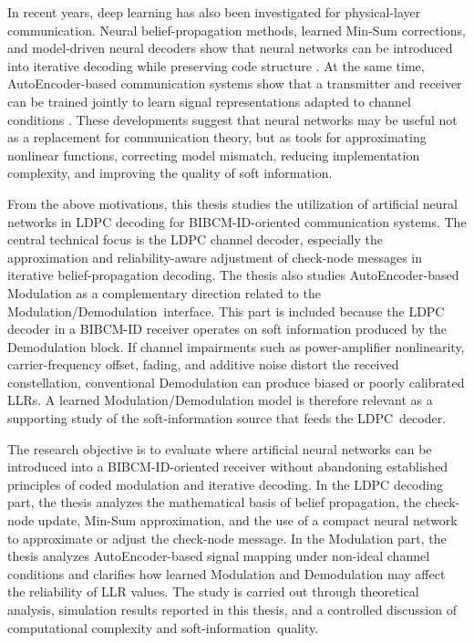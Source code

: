 In recent years, deep learning has also been investigated for physical-layer communication. Neural belief-propagation methods, learned Min-Sum corrections, and model-driven neural decoders show that neural networks can be introduced into iterative decoding while preserving code structure \cite{nachmani2016,nachmani2018,kuck2020,wang2022}. At the same time, AutoEncoder-based communication systems show that a transmitter and receiver can be trained jointly to learn signal representations adapted to channel conditions \cite{oshea2017,dorner2018,aoudia2019}. These developments suggest that neural networks may be useful not as a replacement for communication theory, but as tools for approximating nonlinear functions, correcting model mismatch, reducing implementation complexity, and improving the quality of soft information.

From the above motivations, this thesis studies the utilization of artificial neural networks in LDPC decoding for BIBCM-ID-oriented communication systems. The central technical focus is the LDPC channel decoder, especially the approximation and reliability-aware adjustment of check-node messages in iterative belief-propagation decoding. The thesis also studies AutoEncoder-based Modulation as a complementary direction related to the Modulation/Demodulation~interface. This part is included because the LDPC decoder in a BIBCM-ID receiver operates on soft information produced by the Demodulation block. If channel impairments such as power-amplifier nonlinearity, carrier-frequency offset, fading, and additive noise distort the received constellation, conventional Demodulation can produce biased or poorly calibrated LLRs. A learned Modulation/Demodulation model is therefore relevant as a supporting study of the soft-information source that feeds the LDPC~decoder.

The research objective is to evaluate where artificial neural networks can be introduced into a BIBCM-ID-oriented receiver without abandoning established principles of coded modulation and iterative decoding. In the LDPC decoding part, the thesis analyzes the mathematical basis of belief propagation, the check-node update, Min-Sum approximation, and the use of a compact neural network to approximate or adjust the check-node message. In the Modulation part, the thesis analyzes AutoEncoder-based signal mapping under non-ideal channel conditions and clarifies how learned Modulation and Demodulation may affect the reliability of LLR values. The study is carried out through theoretical analysis, simulation results reported in this thesis, and a controlled discussion of computational complexity and soft-information~quality.

